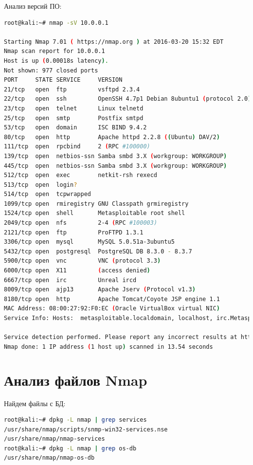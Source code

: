 Анализ версий ПО:

\begin{lstlisting}[language=bash]
root@kali:~# nmap -sV 10.0.0.1

Starting Nmap 7.01 ( https://nmap.org ) at 2016-03-20 15:32 EDT
Nmap scan report for 10.0.0.1
Host is up (0.00018s latency).
Not shown: 977 closed ports
PORT     STATE SERVICE     VERSION
21/tcp   open  ftp         vsftpd 2.3.4
22/tcp   open  ssh         OpenSSH 4.7p1 Debian 8ubuntu1 (protocol 2.0)
23/tcp   open  telnet      Linux telnetd
25/tcp   open  smtp        Postfix smtpd
53/tcp   open  domain      ISC BIND 9.4.2
80/tcp   open  http        Apache httpd 2.2.8 ((Ubuntu) DAV/2)
111/tcp  open  rpcbind     2 (RPC #100000)
139/tcp  open  netbios-ssn Samba smbd 3.X (workgroup: WORKGROUP)
445/tcp  open  netbios-ssn Samba smbd 3.X (workgroup: WORKGROUP)
512/tcp  open  exec        netkit-rsh rexecd
513/tcp  open  login?
514/tcp  open  tcpwrapped
1099/tcp open  rmiregistry GNU Classpath grmiregistry
1524/tcp open  shell       Metasploitable root shell
2049/tcp open  nfs         2-4 (RPC #100003)
2121/tcp open  ftp         ProFTPD 1.3.1
3306/tcp open  mysql       MySQL 5.0.51a-3ubuntu5
5432/tcp open  postgresql  PostgreSQL DB 8.3.0 - 8.3.7
5900/tcp open  vnc         VNC (protocol 3.3)
6000/tcp open  X11         (access denied)
6667/tcp open  irc         Unreal ircd
8009/tcp open  ajp13       Apache Jserv (Protocol v1.3)
8180/tcp open  http        Apache Tomcat/Coyote JSP engine 1.1
MAC Address: 08:00:27:92:F0:EC (Oracle VirtualBox virtual NIC)
Service Info: Hosts:  metasploitable.localdomain, localhost, irc.Metasploitable.LAN; OSs: Unix, Linux; CPE: cpe:/o:linux:linux_kernel

Service detection performed. Please report any incorrect results at https://nmap.org/submit/ .
Nmap done: 1 IP address (1 host up) scanned in 13.54 seconds
\end{lstlisting}

\section{Анализ файлов Nmap}

Найдем файлы с БД:

\begin{lstlisting}[language=bash]
root@kali:~# dpkg -L nmap | grep services
/usr/share/nmap/scripts/snmp-win32-services.nse
/usr/share/nmap/nmap-services
root@kali:~# dpkg -L nmap | grep os-db
/usr/share/nmap/nmap-os-db
\end{lstlisting}

